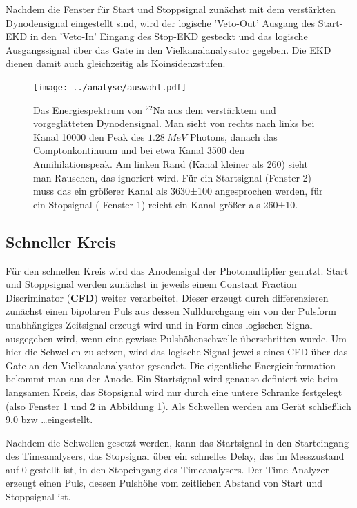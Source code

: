 \documentclass[a4paper,12pt]{article}
\begin{document}
Nachdem die Fenster für Start und Stoppsignal zunächst mit dem verstärkten Dynodensignal eingestellt sind,
wird der logische 'Veto-Out' Ausgang des Start-EKD in den 'Veto-In' Eingang des Stop-EKD gesteckt und das logische Ausgangssignal über das Gate
in den Vielkanalanalysator gegeben.
Die EKD dienen damit auch gleichzeitig als Koinsidenzstufen.

\begin{figure}
	\centering
	\texttt{[image: ../analyse/auswahl.pdf]}
	\caption{Das Energiespektrum von $^{22}$Na aus dem verstärktem und vorgeglätteten
		Dynodensignal.
		Man sieht von rechts nach links bei Kanal 10000 den Peak des $\SI{1.28}{MeV}$ Photons,
		danach das Comptonkontinuum und bei etwa Kanal 3500 den Annihilationspeak.
		Am linken Rand (Kanal kleiner als 260) sieht man Rauschen, das ignoriert wird.
		Für ein Startsignal (Fenster 2) muss das ein größerer Kanal als 3630±100 angesprochen werden, 
		für ein Stopsignal ( Fenster 1) reicht ein Kanal größer als 260±10.}
	\label{fig:auswahl}
\end{figure}


\subsection*{Schneller Kreis}
Für den schnellen Kreis wird das Anodensigal der Photomultiplier genutzt.
Start und Stoppsignal werden zunächst in jeweils einem Constant
Fraction Discriminator (\textbf{CFD}) weiter verarbeitet.
Dieser erzeugt durch differenzieren zunächst einen bipolaren Puls aus dessen Nulldurchgang ein von der Pulsform unabhängiges Zeitsignal erzeugt wird
und in Form eines logischen Signal ausgegeben wird, wenn eine gewisse Pulshöhenschwelle überschritten wurde.
Um hier die Schwellen zu setzen, wird das logische Signal jeweils eines CFD über das Gate an den Vielkanalanalysator gesendet.
Die eigentliche Energieinformation bekommt man aus der Anode.
Ein Startsignal wird genauso definiert wie beim langsamen Kreis, das Stopsignal wird nur durch eine untere Schranke festgelegt (also Fenster 1 und 2 in Abbildung \ref{fig:auswahl}).
Als Schwellen werden am Gerät schließlich 9.0 bzw \dots eingestellt.

Nachdem die Schwellen gesetzt werden, kann das Startsignal in den Starteingang des Timeanalysers, das Stopsignal über ein schnelles Delay, das im Messzustand auf 0 gestellt ist, in den Stopeingang des Timeanalysers.
Der Time Analyzer erzeugt einen Puls, dessen Pulshöhe vom zeitlichen Abstand von Start und Stoppsignal ist.
\end{document}
